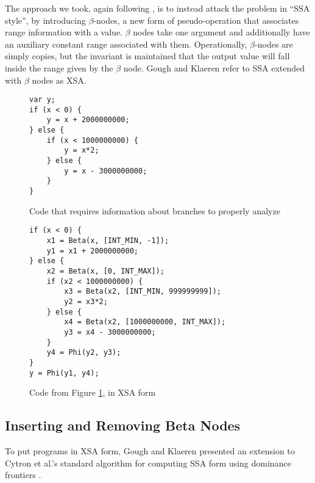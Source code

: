 \documentclass{article}
\begin{document}
The approach we took, again following \cite{Gough94eliminatingrange},
is to instead attack the problem in ``SSA style'', by introducing
$\beta$-nodes, a new form of pseudo-operation that associates range
information with a value. $\beta$ nodes take one argument and
additionally have an auxiliary constant range associated with
them. Operationally, $\beta$-nodes are simply copies, but the
invariant is maintained that the output value will fall inside the
range given by the $\beta$ node. Gough and Klaeren refer to SSA
extended with $\beta$ nodes as XSA.

\begin{figure}[ht]
\begin{center}
\begin{verbatim}
var y;
if (x < 0) {
    y = x + 2000000000;
} else {
    if (x < 1000000000) {
        y = x*2;
    } else {
        y = x - 3000000000;
    }
}
\end{verbatim}
\end{center}
\caption{Code that requires information about branches to properly analyze}
\label{fig:branch}
\end{figure}

\begin{figure}[ht]
\begin{center}
\begin{verbatim}
if (x < 0) {
    x1 = Beta(x, [INT_MIN, -1]);
    y1 = x1 + 2000000000;
} else {
    x2 = Beta(x, [0, INT_MAX]);
    if (x2 < 1000000000) {
        x3 = Beta(x2, [INT_MIN, 999999999]);
        y2 = x3*2;
    } else {
        x4 = Beta(x2, [1000000000, INT_MAX]);
        y3 = x4 - 3000000000;
    }
    y4 = Phi(y2, y3);
}
y = Phi(y1, y4);
\end{verbatim}
\end{center}
\caption{Code from Figure \ref{fig:branch}, in XSA form}
\label{fig:xsa}
\end{figure}

\subsection{Inserting and Removing Beta Nodes}
To put programs in XSA form, Gough and Klaeren presented an extension
to Cytron et al.'s standard algorithm for computing SSA form using
dominance frontiers \cite{Cytron:1991:ECS:115372.115320}.
\end{document}

